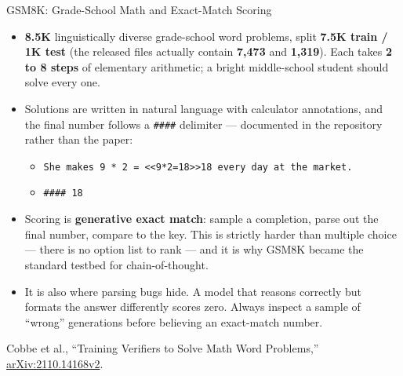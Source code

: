 \begin{frame}{GSM8K: Grade-School Math and Exact-Match Scoring}
  \begin{itemize}\itemsep0.35em
    \item[\textcolor{red}{$\blacktriangleright$}] \textbf{8.5K} linguistically diverse grade-school word problems, split \textbf{7.5K train / 1K test} (the released files actually contain \textbf{7{,}473} and \textbf{1{,}319}). Each takes \textbf{2 to 8 steps} of elementary arithmetic; a bright middle-school student should solve every one.
    \item[\textcolor{red}{$\blacktriangleright$}] Solutions are written in natural language with calculator annotations, and the final number follows a \texttt{\#\#\#\#} delimiter --- documented in the repository rather than the paper:
      \begin{itemize}\footnotesize
        \item[] \texttt{She makes 9 * 2 = \textless{}\textless{}9*2=18\textgreater{}\textgreater{}18 every day at the market.}
        \item[] \texttt{\#\#\#\# 18}
      \end{itemize}
    \item[\textcolor{red}{$\blacktriangleright$}] Scoring is \textbf{generative exact match}: sample a completion, parse out the final number, compare to the key. This is strictly harder than multiple choice --- there is no option list to rank --- and it is why GSM8K became the standard testbed for chain-of-thought.
    \item[\textcolor{red}{$\blacktriangleright$}] It is also where parsing bugs hide. A model that reasons correctly but formats the answer differently scores zero. Always inspect a sample of ``wrong'' generations before believing an exact-match number.
  \end{itemize}
  \vspace{0.15em}
  {\scriptsize Cobbe et al., ``Training Verifiers to Solve Math Word Problems,'' \href{https://arxiv.org/abs/2110.14168v2}{arXiv:2110.14168v2}.}
\end{frame}

